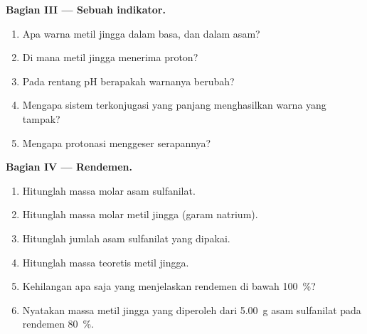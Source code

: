 \begin{problem}
\medskip
\noindent\textbf{Bagian III --- Sebuah indikator.}
\begin{enumerate}[resume]
  \item Apa warna metil jingga dalam basa, dan dalam asam?
  \item Di mana metil jingga menerima proton?
  \item Pada rentang pH berapakah warnanya berubah?
  \item Mengapa sistem terkonjugasi yang panjang menghasilkan warna yang tampak?
  \item Mengapa protonasi menggeser serapannya?
\end{enumerate}

\medskip
\noindent\textbf{Bagian IV --- Rendemen.}
\begin{enumerate}[resume]
  \item Hitunglah massa molar asam sulfanilat.
  \item Hitunglah massa molar metil jingga (garam natrium).
  \item Hitunglah jumlah asam sulfanilat yang dipakai.
  \item Hitunglah massa teoretis metil jingga.
  \item Kehilangan apa saja yang menjelaskan rendemen di bawah 100~\%?
  \item Nyatakan massa metil jingga yang diperoleh dari \qty{5.00}{g} asam
        sulfanilat pada rendemen 80~\%.
\end{enumerate}
\end{problem}
